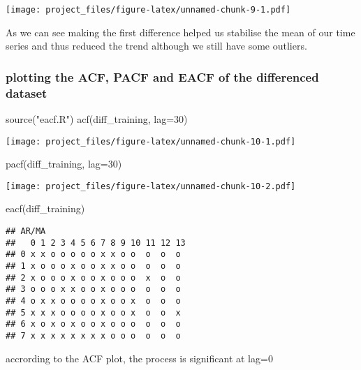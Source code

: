 \documentclass[
]{article}
\newenvironment{Shaded}{\begin{snugshade}}{\end{snugshade}}
\newcommand{\AttributeTok}[1]{\textcolor[rgb]{0.77,0.63,0.00}{#1}}
\newcommand{\DecValTok}[1]{\textcolor[rgb]{0.00,0.00,0.81}{#1}}
\newcommand{\FunctionTok}[1]{\textcolor[rgb]{0.00,0.00,0.00}{#1}}
\newcommand{\NormalTok}[1]{#1}
\newcommand{\StringTok}[1]{\textcolor[rgb]{0.31,0.60,0.02}{#1}}
\begin{document}
\texttt{[image: project\_files/figure-latex/unnamed-chunk-9-1.pdf]}

As we can see making the first difference helped us stabilise the mean
of our time series and thus reduced the trend although we still have
some outliers.

\hypertarget{plotting-the-acf-pacf-and-eacf-of-the-differenced-dataset}{%
\subsubsection{plotting the ACF, PACF and EACF of the differenced
dataset}\label{plotting-the-acf-pacf-and-eacf-of-the-differenced-dataset}}

\begin{Shaded}
\begin{Highlighting}[]
\FunctionTok{source}\NormalTok{(}\StringTok{"eacf.R"}\NormalTok{)}
\FunctionTok{acf}\NormalTok{(diff\_training, }\AttributeTok{lag=}\DecValTok{30}\NormalTok{)}
\end{Highlighting}
\end{Shaded}

\texttt{[image: project\_files/figure-latex/unnamed-chunk-10-1.pdf]}

\begin{Shaded}
\begin{Highlighting}[]
\FunctionTok{pacf}\NormalTok{(diff\_training, }\AttributeTok{lag=}\DecValTok{30}\NormalTok{)}
\end{Highlighting}
\end{Shaded}

\texttt{[image: project\_files/figure-latex/unnamed-chunk-10-2.pdf]}

\begin{Shaded}
\begin{Highlighting}[]
\FunctionTok{eacf}\NormalTok{(diff\_training)}
\end{Highlighting}
\end{Shaded}

\begin{verbatim}
## AR/MA
##   0 1 2 3 4 5 6 7 8 9 10 11 12 13
## 0 x x o o o o o x x o o  o  o  o 
## 1 x o o o x o o x x o o  o  o  o 
## 2 x o o o x o o x o o o  x  o  o 
## 3 o o o x x o o x o o o  o  o  o 
## 4 o x x o o o o x o o x  o  o  o 
## 5 x x x o o o o x o o x  o  o  x 
## 6 x o x o x o o x o o o  o  o  o 
## 7 x x x x x x x x o o o  o  o  o
\end{verbatim}

accrording to the ACF plot, the process is significant at lag=0
\end{document}
